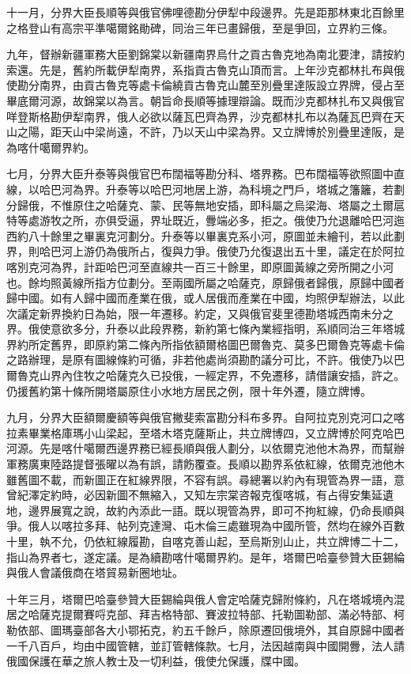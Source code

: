 \begin{pinyinscope}
十一月，分界大臣長順等與俄官佛哩德勘分伊犁中段邊界。先是距那林東北百餘里之格登山有高宗平準噶爾銘勛碑，同治三年已畫歸俄，至是爭回，立界約三條。

九年，督辦新疆軍務大臣劉錦棠以新疆南界烏什之貢古魯克地為南北要津，請按約索還。先是，舊約所載伊犁南界，系指貢古魯克山頂而言。上年沙克都林扎布與俄使勘分南界，由貢古魯克等處卡倫繞貢古魯克山麓至別疊里達阪設立界牌，侵占至畢底爾河源，故錦棠以為言。朝旨命長順等據理辯論。既而沙克都林扎布又與俄官咩登斯格勘伊犁南界，俄人必欲以薩瓦巴齊為界，沙克都林扎布以為薩瓦巴齊在天山之陽，距天山中梁尚遠，不許，乃以天山中梁為界。又立牌博於別疊里達阪，是為喀什噶爾界約。

七月，分界大臣升泰等與俄官巴布闊福等勘分科、塔界務。巴布闊福等欲照圖中直線，以哈巴河為界。升泰等以哈巴河地居上游，為科境之門戶，塔城之籓籬，若劃分歸俄，不惟原住之哈薩克、蒙、民等無地安插，即科屬之烏梁海、塔屬之土爾扈特等處游牧之所，亦俱受逼，界址既近，釁端必多，拒之。俄使乃允退離哈巴河迤西約八十餘里之畢裏克河劃分。升泰等以畢裏克系小河，原圖並未繪刊，若以此劃界，則哈巴河上游仍為俄所占，復與力爭。俄使乃允復退出五十里，議定在於阿拉喀別克河為界，計距哈巴河至直線共一百三十餘里，即原圖黃線之旁所開之小河也。餘均照黃線所指方位劃分。至兩國所屬之哈薩克，原歸俄者歸俄，原歸中國者歸中國。如有人歸中國而產業在俄，或人居俄而產業在中國，均照伊犁辦法，以此次議定新界換約日為始，限一年遷移。約定，又與俄官斐里德勘塔城西南未分之界。俄使意欲多分，升泰以此段界務，新約第七條內業經指明，系順同治三年塔城界約所定舊界，即原約第二條內所指依額爾格圖巴爾魯克、莫多巴爾魯克等處卡倫之路辦理，是原有圖線條約可循，非若他處尚須勘酌議分可比，不許。俄使乃以巴爾魯克山界內住牧之哈薩克久已投俄，一經定界，不免遷移，請借讓安插，許之。仍援舊約第十條所開塔屬原住小水地方居民之例，限十年外遷，隨立牌博。

九月，分界大臣額爾慶額等與俄官撇斐索富勘分科布多界。自阿拉克別克河口之喀拉素畢業格庫瑪小山梁起，至塔木塔克薩斯止，共立牌博四，又立牌博於阿克哈巴河源。先是喀什噶爾西邊界務已經長順與俄人劃分，以依爾克池他木為界，而幫辦軍務廣東陸路提督張曜以為有誤，請飭覆查。長順以勘界系依紅線，依爾克池他木雖舊圖不載，而新圖正在紅線界限，不容有誤。尋總署以約內有現管為界一語，意曾紀澤定約時，必因新圖不無縮入，又知左宗棠咨報克復喀城，有占得安集延遺地，邊界展寬之說，故約內添此一語。既以現管為界，即可不拘紅線，仍命長順與爭。俄人以喀拉多拜、帖列克達灣、屯木倫三處雖現為中國所管，然均在線外百數十里，執不允，仍依紅線履勘，自喀克善山起，至烏斯別山止，共立牌博二十二，指山為界者七，遂定議。是為續勘喀什噶爾界約。是年，塔爾巴哈臺參贊大臣錫綸與俄人會議俄商在塔貿易新圈地址。

十年三月，塔爾巴哈臺參贊大臣錫綸與俄人會定哈薩克歸附條約，凡在塔城境內混居之哈薩克提爾賽哷克部、拜吉格特部、賽波拉特部、托勒圖勒部、滿必特部、柯勒依部、圖瑪臺部各大小鄂拓克，約五千餘戶，除原遷回俄境外，其自原歸中國者一千八百戶，均由中國管轄，並訂管轄條款。七月，法因越南與中國開釁，法人請俄國保護在華之旅人教士及一切利益，俄使允保護，牒中國。


\end{pinyinscope}
